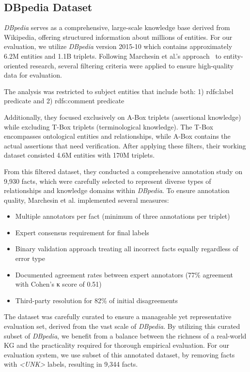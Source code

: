 \subsection{DBpedia Dataset}\label{subsec:empirical-evaluation:dataset-analysis:dbpedia}
\textit{DBpedia} serves as a comprehensive, large-scale knowledge base derived from Wikipedia, offering structured information about millions of entities.
For our evaluation, we utilize \textit{DBpedia} version 2015-10 which contains approximately 6.2M entities and 1.1B triplets.
Following Marchesin et al.'s approach~\cite{Marchesin_Silvello_Alonso_2024} to entity-oriented research, several filtering criteria were applied to ensure high-quality data for evaluation.

The analysis was restricted to subject entities that include both: 1) rdfs:label predicate and 2) rdfs:comment predicate

Additionally, they focused exclusively on A-Box triplets (assertional knowledge) while excluding T-Box triplets (terminological knowledge).
The T-Box encompasses ontological entities and relationships, while A-Box contains the actual assertions that need verification.
After applying these filters, their working dataset consisted 4.6M entities with 170M triplets.

From this filtered dataset, they conducted a comprehensive annotation study on 9,930 facts, which were carefully selected to represent diverse types of relationships and knowledge domains within \textit{DBpedia}.
To ensure annotation quality, Marchesin et al. implemented several measures:
\begin{itemize}
    \item Multiple annotators per fact (minimum of three annotations per triplet)
    \item Expert consensus requirement for final labels
    \item Binary validation approach treating all incorrect facts equally regardless of error type
    \item Documented agreement rates between expert annotators (77\% agreement with Cohen's κ score of 0.51)
    \item Third-party resolution for 82\% of initial disagreements
\end{itemize}

The dataset was carefully curated to ensure a manageable yet representative evaluation set, derived from the vast scale of \textit{DBpedia}.
By utilizing this curated subset of \textit{DBpedia}, we benefit from a balance between the richness of a real-world \ac{KG} and the practicality required for thorough empirical evaluation.
For our evaluation system, we use subset of this annotated dataset, by removing facts with \textit{<UNK>} labels, resulting in 9,344 facts.

